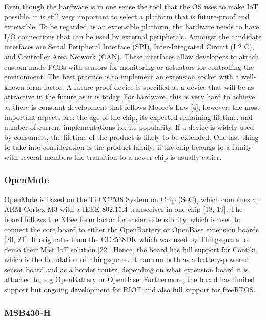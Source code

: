 Even though the hardware is in one sense the tool that the OS uses to make IoT possible,
	it is still very important to select a platform that is future-proof and extensible.
To be regarded as an extensible platform,
	the hardware needs to have I/O connections that can be used by external peripherals.
Amongst the candidate interfaces are Serial Peripheral Interface (SPI),
	Inter-Integrated Circuit (I 2 C),
	and Controller Area Network (CAN).
These interfaces allow developers to attach custom-made PCBs with sensors for monitoring or actuators for controlling the environment.
The best practice is to implement an extension socket with a well-known form factor.
A future-proof device is specified as a device that will be as attractive in the future as it is today.
For hardware,
	this is very hard to achieve as there is constant development that follows Moore’s Law [4];
	however,
	the most important aspects are:
	the age of the chip,
	its expected remaining lifetime,
	and number of current implementations i.e.
its popularity.
If a device is widely used by consumers,
	the lifetime of the product is likely to be extended.
One last thing to take into consideration is the product family;
	if the chip belongs to a family with several members the transition to a newer chip is usually easier.

\subsubsection{OpenMote}

OpenMote is based on the Ti CC2538 System on Chip (SoC),
	which combines an ARM Cortex-M3 with a IEEE 802.15.4 transceiver in one chip [18, 19].
The board follows the XBee form factor for easier extensibility,
	which is used to connect the core board to either the OpenBattery or OpenBase extension boards [20, 21].
It originates from the CC2538DK which was used by Thingsquare to demo their Mist IoT solution [22].
Hence,
	the board has full support for Contiki,
	which is the foundation of Thingsquare.
It can run both as a battery-powered sensor board and as a border router,
	depending on what extension board it is attached to,
	e.g OpenBattery or OpenBase.
Furthermore,
	the board has limited support but ongoing development for RIOT and also full support for freeRTOS.

\subsubsection{MSB430-H}

